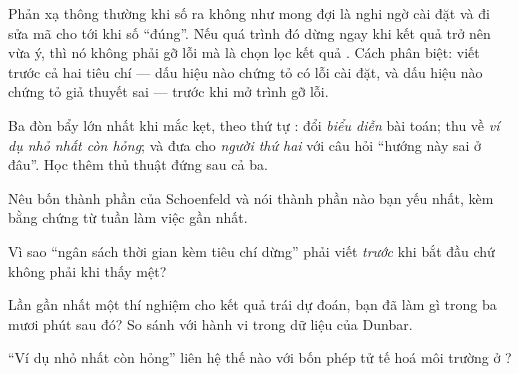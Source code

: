 \documentclass[../hieu-suat.tex]{subfiles}
\begin{document}
\begin{cambay}
Phản xạ thông thường khi số ra không như mong đợi là nghi ngờ cài đặt và đi sửa mã cho tới khi số ``đúng''. Nếu quá trình đó dừng ngay khi kết quả trở nên vừa ý, thì nó không phải gỡ lỗi mà là chọn lọc kết quả \nM{}. Cách phân biệt: viết trước cả hai tiêu chí --- dấu hiệu nào chứng tỏ có lỗi cài đặt, và dấu hiệu nào chứng tỏ giả thuyết sai --- trước khi mở trình gỡ lỗi.
\end{cambay}

\begin{cannho}
Ba đòn bẩy lớn nhất khi mắc kẹt, theo thứ tự \nM{}: đổi \emph{biểu diễn} bài toán; thu về \emph{ví dụ nhỏ nhất còn hỏng}; và đưa cho \emph{người thứ hai} với câu hỏi ``hướng này sai ở đâu''. Học thêm thủ thuật đứng sau cả ba.
\end{cannho}

\begin{traloi}
\end{traloi}

\begin{tukiem}
\item Nêu bốn thành phần của Schoenfeld và nói thành phần nào bạn yếu nhất, kèm bằng chứng từ tuần làm việc gần nhất.
\item Vì sao ``ngân sách thời gian kèm tiêu chí dừng'' phải viết \emph{trước} khi bắt đầu chứ không phải khi thấy mệt?
\item Lần gần nhất một thí nghiệm cho kết quả trái dự đoán, bạn đã làm gì trong ba mươi phút sau đó? So sánh với hành vi trong dữ liệu của Dunbar.
\item ``Ví dụ nhỏ nhất còn hỏng'' liên hệ thế nào với bốn phép tử tế hoá môi trường ở ?
\end{tukiem}

\begin{onbai}
\end{onbai}
\end{document}

